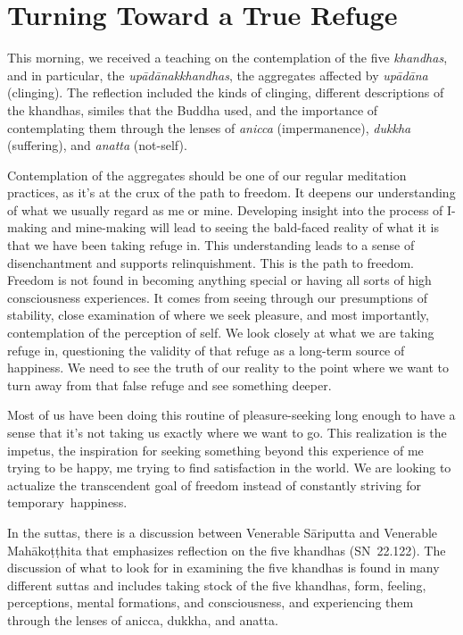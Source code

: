 
\chapter{Turning Toward a True Refuge}

This morning, we received a teaching on the contemplation of the five \emph{khandhas}, and in particular, the \emph{upādānakkhandhas}, the aggregates affected by \emph{upādāna} (clinging). The reflection included the kinds of clinging, different descriptions of the khandhas, similes that the Buddha used, and the importance of contemplating them through the lenses of \emph{anicca} (impermanence), \emph{dukkha} (suffering), and \emph{anatta} (not-self).

Contemplation of the aggregates should be one of our regular meditation practices, as it's at the crux of the path to freedom. It deepens our understanding of what we usually regard as me or mine. Developing insight into the process of I-making and mine-making will lead to seeing the bald-faced reality of what it is that we have been taking refuge in. This understanding leads to a sense of disenchantment and supports relinquishment. This is the path to freedom. Freedom is not found in becoming anything special or having all sorts of high consciousness experiences. It comes from seeing through our presumptions of stability, close examination of where we seek pleasure, and most importantly, contemplation of the perception of self. We look closely at what we are taking refuge in, questioning the validity of that refuge as a long-term source of happiness. We need to see the truth of our reality to the point where we want to turn away from that false refuge and see something deeper.

Most of us have been doing this routine of pleasure-seeking long enough to have a sense that it's not taking us exactly where we want to go. This realization is the impetus, the inspiration for seeking something beyond this experience of me trying to be happy, me trying to find satisfaction in the world. We are looking to actualize the transcendent goal of freedom instead of constantly striving for \mbox{temporary happiness.}

In the suttas, there is a discussion between Venerable Sāriputta and Venerable Mahākoṭṭhita that emphasizes reflection on the five khandhas \mbox{(SN 22.122)}. The discussion of what to look for in examining the five khandhas is found in many different suttas and includes taking stock of the five khandhas, form, feeling, perceptions, mental formations, and consciousness, and experiencing them through the lenses of anicca, dukkha, and anatta.

